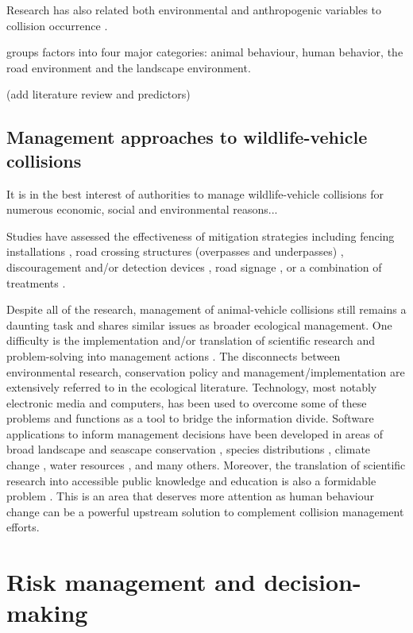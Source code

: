 Research has also related both environmental and anthropogenic variables to collision occurrence \citep{barn07,lee04,ramp05}.

\cite{form03} groups factors into four major categories: animal behaviour, human behavior, the road environment and the landscape environment.

(add literature review and predictors)

\subsection{Management approaches to wildlife-vehicle collisions}

It is in the best interest of authorities to manage wildlife-vehicle collisions for numerous economic, social and environmental reasons...

Studies have assessed the effectiveness of mitigation strategies including fencing installations \citep{clev01,jaeg04}, road crossing structures (overpasses and underpasses) \citep{bond08}, discouragement and/or detection devices \citep{huij03,huij06}, road signage \citep{bond13}, or a combination of treatments \citep{dani98,pola14,romi96}.

Despite all of the research, management of animal-vehicle collisions still remains a daunting task and shares similar issues as broader ecological management.  One difficulty is the implementation and/or translation of scientific research and problem-solving into management actions \citep{roux06}.  The disconnects between environmental research, conservation policy and management/implementation are extensively referred to in the ecological literature.  Technology, most notably electronic media and computers, has been used to overcome some of these problems and functions as a tool to bridge the information divide.  Software applications to inform management decisions have been developed in areas of broad landscape and seascape conservation \citep{ball09,watt09}, species distributions \citep{phil06}, climate change \citep{east09}, water resources \citep{liu08}, and many others.  Moreover, the translation of scientific research into accessible public knowledge and education is also a formidable problem \citep{lubc98}.  This is an area that deserves more attention as human behaviour change can be a powerful upstream solution to complement collision management efforts.

\section{Risk management and decision-making}

